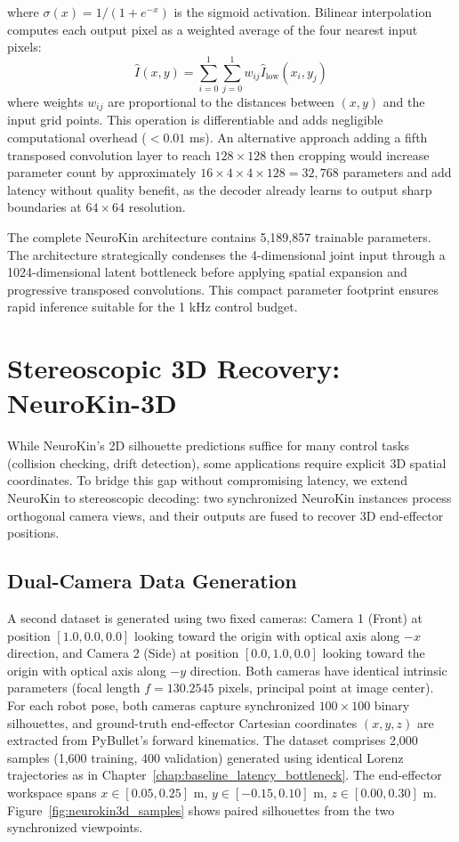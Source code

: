 \documentclass[12pt,a4paper,oneside]{report}
\begin{document}
where $\sigma(x) = 1/(1 + e^{-x})$ is the sigmoid activation. Bilinear interpolation computes each output pixel as a weighted average of the four nearest input pixels:
\begin{equation}
\hat{I}(x,y) = \sum_{i=0}^{1}\sum_{j=0}^{1} w_{ij} \hat{I}_{\text{low}}(x_i, y_j)
\end{equation}
where weights $w_{ij}$ are proportional to the distances between $(x,y)$ and the input grid points. This operation is differentiable and adds negligible computational overhead ($<0.01$ ms). An alternative approach adding a fifth transposed convolution layer to reach $128 \times 128$ then cropping would increase parameter count by approximately $16 \times 4 \times 4 \times 128 = 32,768$ parameters and add latency without quality benefit, as the decoder already learns to output sharp boundaries at $64 \times 64$ resolution.

The complete NeuroKin architecture contains 5,189,857 trainable parameters. The architecture strategically condenses the 4-dimensional joint input through a 1024-dimensional latent bottleneck before applying spatial expansion and progressive transposed convolutions. This compact parameter footprint ensures rapid inference suitable for the 1 kHz control budget.

\section{Stereoscopic 3D Recovery: NeuroKin-3D}

While NeuroKin's 2D silhouette predictions suffice for many control tasks (collision checking, drift detection), some applications require explicit 3D spatial coordinates. To bridge this gap without compromising latency, we extend NeuroKin to stereoscopic decoding: two synchronized NeuroKin instances process orthogonal camera views, and their outputs are fused to recover 3D end-effector positions.

\subsection{Dual-Camera Data Generation}
\label{subsec:dual_camera_data_generation}

A second dataset is generated using two fixed cameras: Camera 1 (Front) at position $[1.0, 0.0, 0.0]$ looking toward the origin with optical axis along $-x$ direction, and Camera 2 (Side) at position $[0.0, 1.0, 0.0]$ looking toward the origin with optical axis along $-y$ direction. Both cameras have identical intrinsic parameters (focal length $f = 130.2545$ pixels, principal point at image center). For each robot pose, both cameras capture synchronized $100 \times 100$ binary silhouettes, and ground-truth end-effector Cartesian coordinates $(x, y, z)$ are extracted from PyBullet's forward kinematics. The dataset comprises 2,000 samples (1,600 training, 400 validation) generated using identical Lorenz trajectories as in Chapter~\ref{chap:baseline_latency_bottleneck}. The end-effector workspace spans $x \in [0.05, 0.25]$ m, $y \in [-0.15, 0.10]$ m, $z \in [0.00, 0.30]$ m. Figure~\ref{fig:neurokin3d_samples} shows paired silhouettes from the two synchronized viewpoints.
\end{document}
